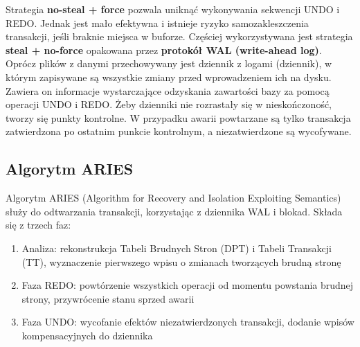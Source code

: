 Strategia \textbf{no-steal + force} pozwala uniknąć wykonywania sekwencji UNDO i REDO. Jednak jest mało efektywna i istnieje ryzyko samozakleszczenia transakcji, jeśli braknie miejsca w buforze.
Częściej wykorzystywana jest strategia \textbf{steal + no-force} opakowana przez \textbf{protokół WAL (write-ahead log)}.
Oprócz plików z danymi przechowywany jest dziennik z logami (dziennik), w którym zapisywane są wszystkie zmiany przed wprowadzeniem ich na dysku.
Zawiera on informacje wystarczające odzyskania zawartości bazy za pomocą operacji UNDO i REDO.
Żeby dzienniki nie rozrastały się w nieskończoność, tworzy się punkty kontrolne. W przypadku awarii powtarzane są tylko transakcja zatwierdzona po ostatnim punkcie kontrolnym, a niezatwierdzone są wycofywane.

\subsection{Algorytm ARIES}
Algorytm ARIES (Algorithm for Recovery and Isolation Exploiting Semantics) służy do odtwarzania transakcji, korzystając z dziennika WAL i blokad.
Składa się z trzech faz:
\begin{enumerate}
    \item Analiza: rekonstrukcja Tabeli Brudnych Stron (DPT) i Tabeli Transakcji (TT), wyznaczenie pierwszego wpisu o zmianach tworzących brudną stronę
    \item Faza REDO: powtórzenie wszystkich operacji od momentu powstania brudnej strony, przywrócenie stanu sprzed awarii
    \item Faza UNDO: wycofanie efektów niezatwierdzonych transakcji, dodanie wpisów kompensacyjnych do dziennika
\end{enumerate}